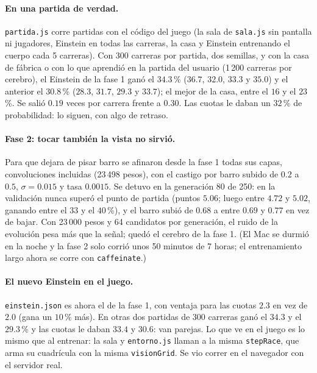\documentclass[11pt,letterpaper]{article}
\begin{document}
\paragraph{En una partida de verdad.} \texttt{partida.js} corre partidas con el código del juego (la sala de \texttt{sala.js} sin pantalla ni jugadores, Einstein en todas las carreras, la casa y Einstein entrenando el cuerpo cada 5 carreras). Con 300 carreras por partida, dos semillas, y con la casa de fábrica o con lo que aprendió en la partida del usuario (1\,200 carreras por cerebro), el Einstein de la fase 1 ganó el $34.3$\,\% ($36.7$, $32.0$, $33.3$ y $35.0$) y el anterior el $30.8$\,\% ($28.3$, $31.7$, $29.3$ y $33.7$); el mejor de la casa, entre el $16$ y el $23$\,\%. Se salió $0.19$ veces por carrera frente a $0.30$. Las cuotas le daban un $32$\,\% de probabilidad: lo siguen, con algo de retraso.

\paragraph{Fase 2: tocar también la vista no sirvió.} Para que dejara de pisar barro se afinaron desde la fase 1 todas sus capas, convoluciones incluidas (23\,498 pesos), con el castigo por barro subido de $0.2$ a $0.5$, $\sigma = 0.015$ y tasa $0.0015$. Se detuvo en la generación 80 de 250: en la validación nunca superó el punto de partida (puntos $5.06$; luego entre $4.72$ y $5.02$, ganando entre el $33$ y el $40$\,\%), y el barro subió de $0.68$ a entre $0.69$ y $0.77$ en vez de bajar. Con 23\,000 pesos y 64 candidatos por generación, el ruido de la evolución pesa más que la señal; quedó el cerebro de la fase 1. (El Mac se durmió en la noche y la fase 2 solo corrió unos 50 minutos de 7 horas; el entrenamiento largo ahora se corre con \texttt{caffeinate}.)

\paragraph{El nuevo Einstein en el juego.} \texttt{einstein.json} es ahora el de la fase 1, con ventaja para las cuotas $2.3$ en vez de $2.0$ (gana un $10$\,\% más). En otras dos partidas de 300 carreras ganó el $34.3$ y el $29.3$\,\% y las cuotas le daban $33.4$ y $30.6$: van parejas. Lo que ve en el juego es lo mismo que al entrenar: la sala y \texttt{entorno.js} llaman a la misma \texttt{stepRace}, que arma su cuadrícula con la misma \texttt{visionGrid}. Se vio correr en el navegador con el servidor real.
\end{document}
